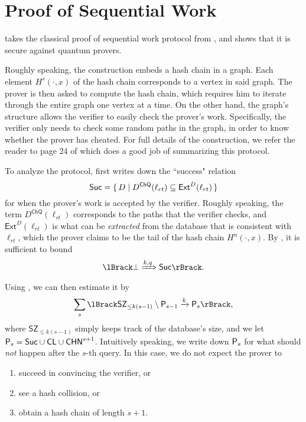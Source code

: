 \section{Proof of Sequential Work}

\cite{main-result} takes the classical proof of sequential work protocol from \cite{posw}, and shows that it is secure against quantum provers.

Roughly speaking, the construction embeds a hash chain in a graph.
Each element $H^s(\cdot, x)$ of the hash chain corresponds to a vertex in said graph.
The prover is then asked to compute the hash chain,
which requires him to iterate through the entire graph one vertex at a time.
On the other hand, the graph's structure allows the verifier to easily check the prover's work.
Specifically, the verifier only needs to check some random paths in the graph, in order to know whether the prover has cheated.
For full details of the construction, we refer the reader to page 24 of \cite{main-result} which does a good job of summarizing this protocol.

To analyze the protocol, \cite{main-result} first writes down the ``success" relation
$$\mathsf{Suc}=\set{D|D^{\mathsf{ChQ}}(\ell_{rt})\subseteq \mathsf{Ext}^D(\ell_{rt})}$$
for when the prover's work is accepted by the verifier.
Roughly speaking, the term $D^{\mathsf{ChQ}}(\ell_{rt})$ corresponds to the paths that the verifier checks,
and $\mathsf{Ext}^D(\ell_{rt})$ is what can be \emph{extracted} from the database that is consistent with $\ell_{rt}$,
which the prover claims to be the tail of the hash chain $H^n(\cdot, x)$.
By , it is sufficient to bound
$$\lBrack\bot\xRightarrow{k, q}\mathsf{Suc}\rBrack.$$
Using ,
we can then estimate it by
\begin{equation}
	\label{eq:posw-multi-to-single}
	\sum_{s}\lBrack\mathsf{SZ}_{\leq k(s-1)}\setminus\sfP_{s-1}\xrightarrow{k}\sfP_s\rBrack,
\end{equation}
where $\mathsf{SZ}_{\leq k(s-1)}$ simply keeps track of the database's size,
and we let $\mathsf{P}_s=\mathsf{Suc}\cup\mathsf{CL}\cup\mathsf{CHN}^{s+1}$.
Intuitively speaking, we write down $\mathsf{P}_s$ for what should \emph{not} happen after the $s$-th query.
In this case, we do not expect the prover to
\begin{enumerate}
	\item succeed in convincing the verifier, or
	\item see a hash collision, or
	\item obtain a hash chain of length $s+1$.
\end{enumerate}

